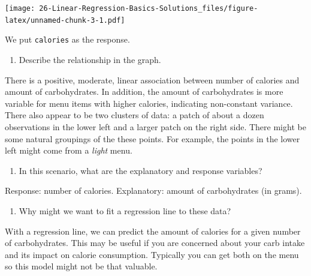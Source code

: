 \documentclass[
]{book}
\newenvironment{Shaded}{\begin{snugshade}}{\end{snugshade}}
\newcommand{\DataTypeTok}[1]{\textcolor[rgb]{0.13,0.29,0.53}{#1}}
\newcommand{\KeywordTok}[1]{\textcolor[rgb]{0.13,0.29,0.53}{\textbf{#1}}}
\newcommand{\NormalTok}[1]{#1}
\newcommand{\OperatorTok}[1]{\textcolor[rgb]{0.81,0.36,0.00}{\textbf{#1}}}
\newcommand{\StringTok}[1]{\textcolor[rgb]{0.31,0.60,0.02}{#1}}
\providecommand{\tightlist}{%
  \setlength{\itemsep}{0pt}\setlength{\parskip}{0pt}}
\begin{document}
\begin{Shaded}
\end{Shaded}

\texttt{[image: 26-Linear-Regression-Basics-Solutions\_files/figure-latex/unnamed-chunk-3-1.pdf]}

We put \texttt{calories} as the response.

\begin{enumerate}
\def\labelenumi{\alph{enumi}.}
\setcounter{enumi}{1}
\tightlist
\item
  Describe the relationship in the graph.
\end{enumerate}

There is a positive, moderate, linear association between number of calories and amount of carbohydrates. In addition, the amount of carbohydrates is more variable for menu items with higher calories, indicating non-constant variance. There also appear to be two clusters of data: a patch of about a dozen observations in the lower left and a
larger patch on the right side. There might be some natural groupings of the these points. For example, the points in the lower left might come from a \emph{light} menu.

\begin{enumerate}
\def\labelenumi{\alph{enumi}.}
\setcounter{enumi}{2}
\tightlist
\item
  In this scenario, what are the explanatory and response variables?
\end{enumerate}

Response: number of calories. Explanatory: amount of carbohydrates (in grams).

\begin{enumerate}
\def\labelenumi{\alph{enumi}.}
\setcounter{enumi}{3}
\tightlist
\item
  Why might we want to fit a regression line to these data?
\end{enumerate}

With a regression line, we can predict the amount of calories for a given number of carbohydrates. This may be useful if you are concerned about your carb intake and its impact on calorie consumption. Typically you can get both on the menu so this model might not be that valuable.
\end{document}
